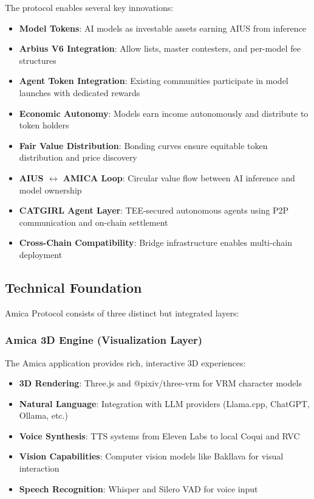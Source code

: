 \documentclass{article}
\begin{document}
The protocol enables several key innovations:

\begin{itemize}
    \item \textbf{Model Tokens}: AI models as investable assets earning AIUS from inference
    \item \textbf{Arbius V6 Integration}: Allow lists, master contesters, and per-model fee structures
    \item \textbf{Agent Token Integration}: Existing communities participate in model launches with dedicated rewards
    \item \textbf{Economic Autonomy}: Models earn income autonomously and distribute to token holders
    \item \textbf{Fair Value Distribution}: Bonding curves ensure equitable token distribution and price discovery
    \item \textbf{AIUS $\leftrightarrow$ AMICA Loop}: Circular value flow between AI inference and model ownership
    \item \textbf{CATGIRL Agent Layer}: TEE-secured autonomous agents using P2P communication and on-chain settlement
    \item \textbf{Cross-Chain Compatibility}: Bridge infrastructure enables multi-chain deployment
\end{itemize}

\subsection{Technical Foundation}

Amica Protocol consists of three distinct but integrated layers:

\subsubsection{Amica 3D Engine (Visualization Layer)}

The Amica application provides rich, interactive 3D experiences:
\begin{itemize}
    \item \textbf{3D Rendering}: Three.js and @pixiv/three-vrm for VRM character models
    \item \textbf{Natural Language}: Integration with LLM providers (Llama.cpp, ChatGPT, Ollama, etc.)
    \item \textbf{Voice Synthesis}: TTS systems from Eleven Labs to local Coqui and RVC
    \item \textbf{Vision Capabilities}: Computer vision models like Bakllava for visual interaction
    \item \textbf{Speech Recognition}: Whisper and Silero VAD for voice input
\end{itemize}
\end{document}
